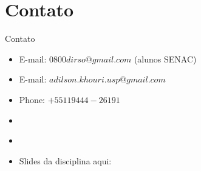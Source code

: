 \section*{Contato}

\begin{frame}	
	\begin{block}{Contato}	
		\begin{itemize}
			\item E-mail:  $0800dirso@gmail.com$ (alunos SENAC)			
			\item E-mail:  $adilson.khouri.usp@gmail.com$
			\item Phone: $+55 11 9444-26191$
			\item \href{https://www.linkedin.com/in/adilson-khouri-51893918/}{\color{blue}{Linkedin}}
			\item \href{http://lattes.cnpq.br/2654721135214993}{\color{blue}{Lattes}}
			\item Slides da disciplina aqui: \href{https://github.com/khouri/}{\color{blue}{GitHub}}
		\end{itemize}
	\end{block}
\end{frame}

